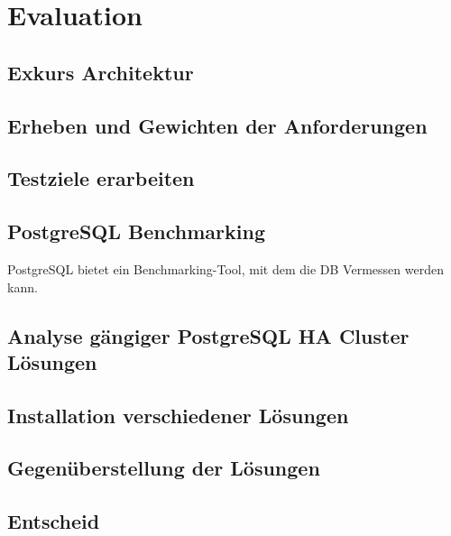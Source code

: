 
\section{Evaluation}
\subsection{Exkurs Architektur}





\subsection{Erheben und Gewichten der Anforderungen}

\subsection{Testziele erarbeiten}
\subsection{PostgreSQL Benchmarking}
PostgreSQL bietet ein Benchmarking-Tool,\cite{TYJFF7AB,VXNYQFTE} mit dem die DB Vermessen werden kann.
\subsection{Analyse gängiger PostgreSQL HA Cluster Lösungen}








\subsection{Installation verschiedener Lösungen}


\subsection{Gegenüberstellung der Lösungen}

\subsection{Entscheid}